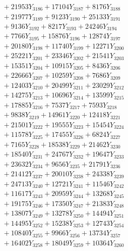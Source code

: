 \documentclass[a4paper,10pt]{article}
\begin{document}
{\begin{align}
&\;  + 21953 Y_{3186} + 17104 Y_{3187} + 8176 Y_{3188} \\[0.3ex]
&\;  + 21977 Y_{3189} + 9123 Y_{3190} + 25133 Y_{3191} \\[0.3ex]
&\;  + 9136 Y_{3192} + 8217 Y_{3193} + 24246 Y_{3194} \\[0.3ex]
&\;  + 7766 Y_{3195} + 15876 Y_{3196} + 12874 Y_{3197} \\[0.3ex]
&\;  + 20180 Y_{3198} + 11740 Y_{3199} + 12271 Y_{3200} \\[0.3ex]
&\;  + 25221 Y_{3201} + 23346 Y_{3202} + 21541 Y_{3203} \\[0.3ex]
&\;  + 15351 Y_{3204} + 10915 Y_{3205} + 8436 Y_{3206} \\[0.3ex]
&\;  + 22666 Y_{3207} + 10259 Y_{3208} + 7686 Y_{3209} \\[0.5ex]\allowbreak
&\;  + 12403 Y_{3210} + 20499 Y_{3211} + 23029 Y_{3212} \\[0.3ex]
&\;  + 14275 Y_{3213} + 10696 Y_{3214} + 13599 Y_{3215} \\[0.3ex]
&\;  + 17885 Y_{3216} + 7537 Y_{3217} + 7593 Y_{3218} \\[0.3ex]
&\;  + 9838 Y_{3219} + 14961 Y_{3220} + 12418 Y_{3221} \\[0.3ex]
&\;  + 21501 Y_{3222} + 19555 Y_{3223} + 15454 Y_{3224} \\[0.3ex]
&\;  + 11578 Y_{3225} + 17455 Y_{3226} + 6824 Y_{3227} \\[0.3ex]
&\;  + 7165 Y_{3228} + 18538 Y_{3229} + 21462 Y_{3230} \\[0.3ex]
&\;  + 18540 Y_{3231} + 24767 Y_{3232} + 19647 Y_{3233} \\[0.3ex]
&\;  + 23632 Y_{3234} + 9656 Y_{3235} + 21791 Y_{3236} \\[0.3ex]
&\;  + 21412 Y_{3237} + 20010 Y_{3238} + 24338 Y_{3239} \\[0.5ex]\allowbreak
&\;  + 24713 Y_{3240} + 12721 Y_{3241} + 11546 Y_{3242} \\[0.3ex]
&\;  + 11617 Y_{3243} + 20959 Y_{3244} + 13268 Y_{3245} \\[0.3ex]
&\;  + 19175 Y_{3246} + 17350 Y_{3247} + 21383 Y_{3248} \\[0.3ex]
&\;  + 13807 Y_{3249} + 13278 Y_{3250} + 14494 Y_{3251} \\[0.3ex]
&\;  + 14495 Y_{3252} + 15238 Y_{3253} + 12743 Y_{3254} \\[0.3ex]
&\;  + 10840 Y_{3255} + 9966 Y_{3256} + 13734 Y_{3257} \\[0.3ex]
&\;  + 16402 Y_{3258} + 18049 Y_{3259} + 10364 Y_{3260} \\[0.3ex]

\end{align}}
\end{document}
